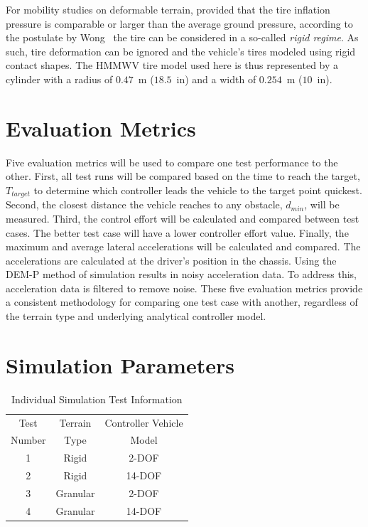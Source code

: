 \documentclass[12pt,onecolumn]{report}
\begin{document}
For mobility studies on deformable terrain, provided that the tire inflation pressure is comparable or larger than the average ground pressure, according to the postulate by Wong~\cite{wong93} the tire can be considered in a so-called {\em rigid regime}.  As such, tire deformation can be ignored and the vehicle's tires modeled using rigid contact shapes.  The HMMWV tire model used here is thus represented by a cylinder with a radius of $0.47$~m ($18.5$~in) and a width of $0.254$~m ($10$~in).

\section{Evaluation Metrics}\label{s:Metrics}
Five evaluation metrics will be used to compare one test performance to the other. First, all test runs will be compared based on the time to reach the target, $T_{target}$ to determine which controller leads the vehicle to the target point quickest. Second, the closest distance the vehicle reaches to any obstacle, $d_{min}$, will be measured. Third, the control effort will be calculated and compared between test cases. The better test case will have a lower controller effort value. Finally, the maximum and average lateral accelerations will be calculated and compared. The accelerations are calculated at the driver's position in the chassis. Using the DEM-P method of simulation results in noisy acceleration data. To address this, acceleration data is filtered to remove noise. These five evaluation metrics provide a consistent methodology for comparing one test case with another, regardless of the terrain type and underlying analytical controller model.


\section{Simulation Parameters}\label{s:SimParameters}

\begin{table}
\begin{center}
	\begin{tabular}{||c |c | c||} 
		\hline
		Test  & Terrain  & Controller Vehicle \\
		Number &  Type & Model\\ [0.5ex] 	
		\hline\hline
		1 & Rigid & 2-DOF \\ 
		\hline
		2 & Rigid & 14-DOF \\
		\hline
		3 & Granular & 2-DOF \\
		\hline
		4 & Granular & 14-DOF \\
		\hline
	\end{tabular}
\end{center}
\caption{Individual Simulation Test Information}
\label{t:TestMatrix}
\end{table}
\end{document}
